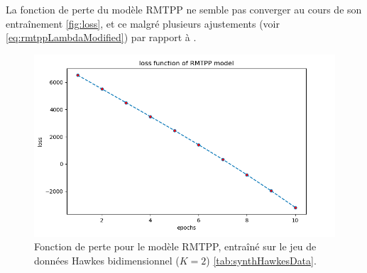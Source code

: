 \documentclass[../main.tex]{subfiles}
\begin{document}
La fonction de perte du modèle RMTPP ne semble pas converger au cours de son entraînement \autoref{fig:loss}, et ce malgré plusieurs ajustements (voir \eqref{eq:rmtppLambdaModified}) par rapport à \autocite{DuRMTPP}.
\begin{figure}[!ht]
	\centering
	\includegraphics[width=\linewidth]{../results/loss_funct}
	\caption{Fonction de perte pour le modèle RMTPP, entraîné sur le jeu de données Hawkes bidimensionnel ($K=2$) \autoref{tab:synthHawkesData}.}\label{fig:loss}
\end{figure}
\end{document}
